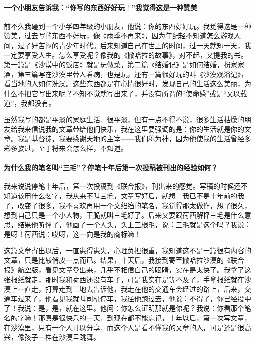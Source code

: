 \paragraph*{一个小朋友告诉我：“你写的东西好好玩！”我觉得这是一种赞美}
\par 前不久我碰到一个小学四年级的小朋友，他说：你的东西好好玩。我觉得这是一种赞美，过去写的东西不好玩，像《雨季不再来》，因为年纪轻不知道怎么游戏人间，过了好苦闷的青少年时代。后来知道自己在世上的时间，过一天就短一天，我一定要享受人生。怎么享受呢？像我的《撒哈拉的故事》，对不起，又提我的书。第一篇是《沙漠中的饭店》就是玩做菜，第二篇《结婚记》是如何结婚，扮家家酒，第三篇写在沙漠里替人看病，也是玩，还有一篇很好玩的叫《沙漠观浴记》，看当地的人如何洗澡。这些东西都是在心情很好时，发现自己的生活这么美丽，为什么不把它写出来呢？不知不觉就写出来了，并没有所谓的“使命感”或是“文以载道”，我都没有。
\par 虽然我写的都是平淡的家庭生活，很平淡，但有一点不得不说，很多生活枯燥的朋友给我来信说我的文章带给他们快乐，我在这里要强调的是：你的生活就是你的文章。我是基督徒，我要感谢天地的主宰——我们称为神，因为他使我的生活曾经多彩多姿过，至于将来会怎么样，不知道。

\paragraph*{为什么我的笔名叫“三毛”？停笔十年后第一次投稿被刊出的经验如何？}
\par 我来说说停笔十年后，第一次投稿到《联合报》，刊出来的感觉。写稿的时候还不知道该用什么名字，我从来不叫三毛，文章写好后，就想：我已不是十年前的我了，改变了很多，我不喜欢再用一个文绉绉的笔名，我觉得那太做作，想了很久，想到自己只是一个小人物，干脆就叫三毛好了。后来又要跟荷西解释三毛是什么意思，结果他听懂了，他画了一个人头，头上三根毛，说：三毛就是这个吗？我说：是呀！荷西说：哎呀，这一向是我的商标嘛！
\par 这篇文章寄出以后，一直患得患失，心理负担很重，我知道这不是一篇很有内容的文章，只是比较俏皮一点而已。结果，十天后，我接到寄至撒哈拉沙漠的《联合报》航空版，看见文章登出来，几乎不相信自己的眼睛，实在是太快了。我拿了这张报纸就走，那时我和荷西还没有车子，可是我实在是等不及了，手拿报纸就在沙漠上一直走，打算走到工地去告诉他，我走在他的交通车会经过的路上，后来，交通车过来了，他看见我就叫司机停车，我往他跑过去，他说：不得了，你已经投中了！我说：是，是，就在这里。他问：你怎么证明那就是你呢？我说：你看那个笔名的字嘛！那真是很快乐的一天，到现在都不能忘记，十年以后，第一次写文章，在沙漠里，只有一个人可以分享，而这个人是看不懂我的文章的人，可是还是很高兴，像孩子一样在沙漠里跳舞。

